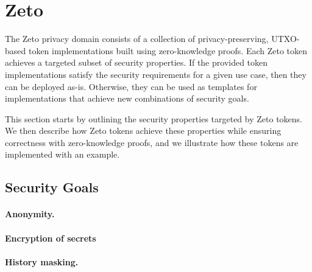 \section{Zeto}

The Zeto privacy domain consists of a collection of privacy-preserving, UTXO-based token implementations built using zero-knowledge proofs. Each Zeto token achieves a targeted subset of security properties. If the provided token implementations satisfy the security requirements for a given use case, then they can be deployed as-is. Otherwise, they can be used as templates for implementations that achieve new combinations of security goals.

This section starts by outlining the security properties targeted by Zeto tokens. We then describe how Zeto tokens achieve these properties while ensuring correctness with zero-knowledge proofs, and we illustrate how these tokens are implemented with an example.


\subsection{Security Goals}

\paragraph{Anonymity.}


\paragraph{Encryption of secrets} %


\paragraph{History masking.}

